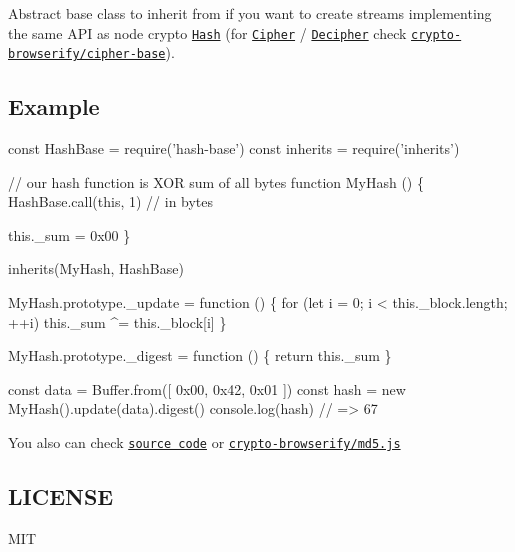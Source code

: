 \href{https://www.npmjs.org/package/hash-base}{\tt } \href{https://travis-ci.org/crypto-browserify/hash-base}{\tt } \href{https://david-dm.org/crypto-browserify/hash-base#info=dependencies}{\tt }

\href{https://github.com/feross/standard}{\tt }

Abstract base class to inherit from if you want to create streams implementing the same A\+PI as node crypto \href{https://nodejs.org/api/crypto.html#crypto_class_hash}{\tt Hash} (for \href{https://nodejs.org/api/crypto.html#crypto_class_cipher}{\tt Cipher} / \href{https://nodejs.org/api/crypto.html#crypto_class_decipher}{\tt Decipher} check \href{https://github.com/crypto-browserify/cipher-base}{\tt crypto-\/browserify/cipher-\/base}).

\subsection*{Example}


\begin{DoxyCode}
const HashBase = require('hash-base')
const inherits = require('inherits')

// our hash function is XOR sum of all bytes
function MyHash () \{
  HashBase.call(this, 1) // in bytes

  this.\_sum = 0x00
\}

inherits(MyHash, HashBase)

MyHash.prototype.\_update = function () \{
  for (let i = 0; i < this.\_block.length; ++i) this.\_sum ^= this.\_block[i]
\}

MyHash.prototype.\_digest = function () \{
  return this.\_sum
\}

const data = Buffer.from([ 0x00, 0x42, 0x01 ])
const hash = new MyHash().update(data).digest()
console.log(hash) // => 67
\end{DoxyCode}
 You also can check \href{index.js}{\tt source code} or \href{https://github.com/crypto-browserify/md5.js}{\tt crypto-\/browserify/md5.\+js}

\subsection*{L\+I\+C\+E\+N\+SE}

M\+IT 